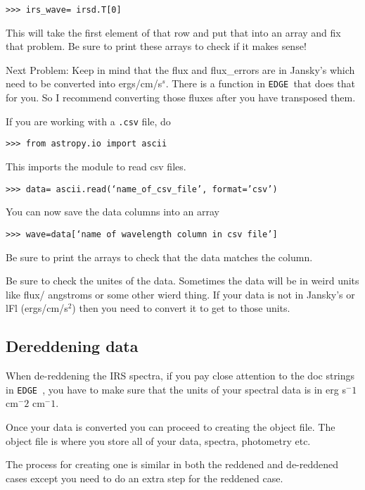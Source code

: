 \documentclass{article}
\newcommand{\edge}{\texttt{EDGE }}
\begin{document}
\vspace{2mm}
\texttt{>>> irs\_wave= irsd.T[0]}
\vspace{2mm}

This will take the first element of that row and put that into an array and fix that problem. Be sure to print these arrays to check if it makes sense!

Next Problem:   Keep in mind that the flux and flux\_errors are in Jansky’s which need to be converted into ergs/cm/s$^s$. There is a function in \edge that does that for you. So I recommend converting those fluxes after you have transposed them. 	

If you are working with a \texttt{.csv} file, do

\vspace{2mm}
\texttt{>>> from astropy.io import ascii}  
\vspace{2mm}

This imports the module to read csv files.  

\vspace{2mm}
\texttt{>>> data= ascii.read(‘name\_of\_csv\_file’, format=’csv’)}
\vspace{2mm}

You can now save the data columns into an array

\vspace{2mm}
\texttt{>>> wave=data[‘name of wavelength column in csv file’]}
\vspace{2mm}

Be sure to print the arrays to check that the data matches the column.

Be sure to check the unites of the data.  Sometimes the data will be in weird units like  flux/ angstroms or some other wierd thing. If your data is not in Jansky’s or lFl  (ergs/cm/s$^2$) then you need to convert it to get to those units. 

\subsection{Dereddening data}

When de-reddening the IRS spectra, if you pay close attention to the doc strings in \edge, you have to make sure that the units of your spectral data is in erg s$^-1$ cm$^-2$ cm$^-1$. 

Once your data is converted you can proceed to creating the object file. The object file is where you store all of your data, spectra, photometry etc. 

The process for creating one is similar in both the reddened and de-reddened cases except you need to do an extra step for the reddened case. 
\end{document}
